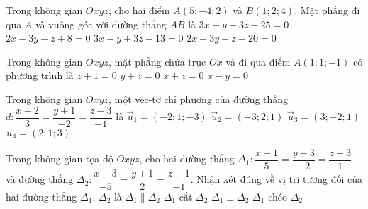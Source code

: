 \begin{ex}%
Trong không gian $O x y z$, cho hai điểm $A(5 ;-4 ; 2)$ và $B(1 ; 2 ; 4)$. Mặt phẳng đi qua $A$ và vuông góc với đường thẳng $A B$ là
\choice
{$3x-y+3z-25=0$}
{$2x-3y-z+8=0$}
{$3x-y+3z-13=0$}
{\True $2x-3y-z-20=0$}
\end{ex}

\begin{ex}%
Trong không gian $Oxyz$, mặt phẳng chứa trục $Ox$ và đi qua điểm $A(1;1;-1)$ có phương trình là
\choice
{$z+1=0$}
{\True $y+z=0$}
{$x+z=0$}
{$x-y=0$}
\end{ex}

\begin{ex}%
Trong không gian $Oxyz$, một véc-tơ chỉ phương của đường thẳng $d\colon \dfrac{x+2}{3}=\dfrac{y+1}{-2}=\dfrac{z-3}{-1}$ là
\choice
{$\overrightarrow{u}_1=(-2;1;-3)$}
{\True $\overrightarrow{u}_2=(-3;2;1)$}
{$\overrightarrow{u}_3=(3;-2;1)$}
{$\overrightarrow{u}_4=(2;1;3)$}
\end{ex}

\begin{ex}%
Trong không gian tọa độ $Oxyz$, cho hai đường thẳng $\Delta_1\colon \dfrac{x-1}{5}=\dfrac{y-3}{-2}=\dfrac{z+3}{1}$ và đường thẳng $\Delta_2\colon \dfrac{x-3}{-5}=\dfrac{y+1}{2}=\dfrac{z-1}{-1}$. Nhận xét đúng về vị trí tương đối của hai đường thẳng $\Delta_1$, $\Delta_2$ là
\choice
{\True $\Delta_1\parallel\Delta_2$}
{$\Delta_1$ cắt $\Delta_2$}
{$\Delta_1\equiv\Delta_2$}
{$\Delta_1$ chéo $\Delta_2$}
\end{ex}


